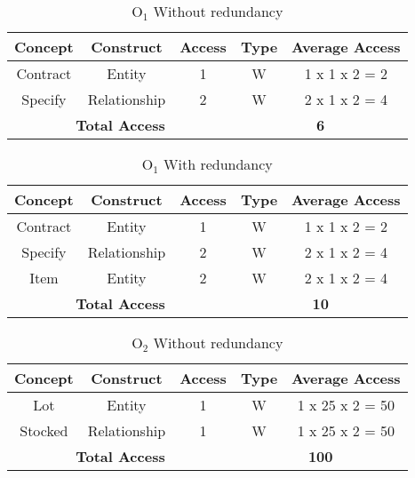 \begin{table}[!h]\caption{	$ \textrm{O}_\textrm{1} $ Without redundancy}
	\begin{center}
		\begin{tabular}{| c | c | c | c | c |}
			\hline
			\textbf{Concept} & \textbf{Construct} & \textbf{Access} & \textbf{Type} & \textbf{Average Access} \\ \hline
			Contract & Entity & 1 & W & 1 x 1 x 2 = 2 \\ \hline
			Specify & Relationship & 2 & W & 2 x 1 x 2 = 4 \\ \hline
			\multicolumn{3}{|c|}{\textbf{Total Access}} & \multicolumn{2}{|c|}{\textbf{6}} \\ \hline
		\end{tabular}
	\end{center}
\end{table}
\begin{table}[!h]\caption{	$ \textrm{O}_\textrm{1} $ With redundancy}
	\begin{center}
		\begin{tabular}{| c | c | c | c | c |}
			\hline
			\textbf{Concept} & \textbf{Construct} & \textbf{Access} & \textbf{Type} & \textbf{Average Access} \\ \hline
			Contract & Entity & 1 & W & 1 x 1 x 2 = 2 \\ \hline
			Specify & Relationship & 2 & W & 2 x 1 x 2 = 4 \\ \hline
			Item & Entity & 2 & W & 2 x 1 x 2 = 4 \\ \hline
			\multicolumn{3}{|c|}{\textbf{Total Access}} & \multicolumn{2}{|c|}{\textbf{10}} \\ \hline
		\end{tabular}
	\end{center}
\end{table}
\begin{table}[!h]\caption{	$ \textrm{O}_\textrm{2} $ Without redundancy}
	\begin{center}
		\begin{tabular}{| c | c | c | c | c |}
			\hline
			\textbf{Concept} & \textbf{Construct} & \textbf{Access} & \textbf{Type} & \textbf{Average Access} \\ \hline
			Lot & Entity & 1 & W & 1 x 25 x 2 = 50 \\ \hline
			Stocked & Relationship & 1 & W & 1 x 25 x 2 = 50 \\ \hline
			\multicolumn{3}{|c|}{\textbf{Total Access}} & \multicolumn{2}{|c|}{\textbf{100}} \\ \hline
		\end{tabular}
	\end{center}
\end{table}
